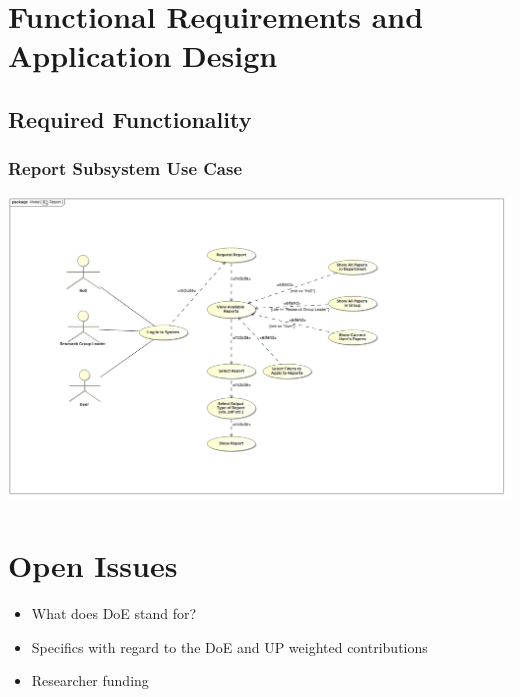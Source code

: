 \documentclass{article}
\begin{document}
	\section{Functional Requirements and Application Design}
	\subsection{Required Functionality}
	\subsubsection{Report Subsystem Use Case}
	\includegraphics[width=\textwidth]{ReportUseCase}

	\section{Open Issues}
	\begin{itemize}
		\item What does DoE stand for?
		\item Specifics with regard to the DoE and UP weighted contributions
		\item Researcher funding
	\end{itemize}
\end{document}
